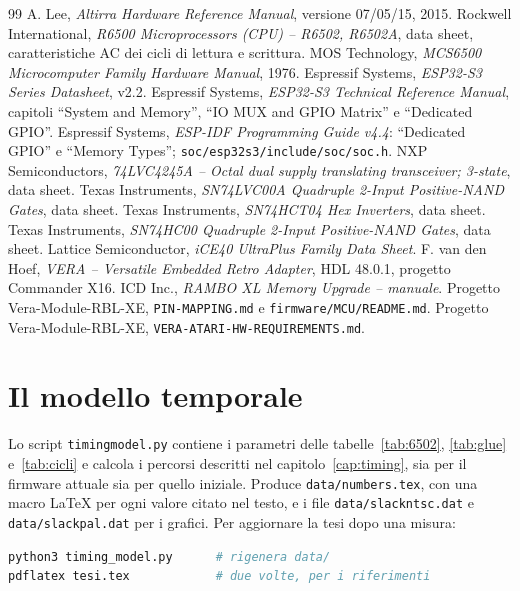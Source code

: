 \documentclass[11pt,a4paper,twoside,openright]{report}
\DeclareRobustCommand{\code}[1]{\begingroup\renewcommand{\_}{\textunderscore\allowbreak}\texttt{#1}\endgroup}
\begin{document}
\begin{thebibliography}{99}
 A. Lee, \emph{Altirra Hardware Reference Manual}, versione 07/05/15, 2015.
 Rockwell International, \emph{R6500 Microprocessors (CPU) -- R6502, R6502A},
  data sheet, caratteristiche AC dei cicli di lettura e scrittura.
 MOS Technology, \emph{MCS6500 Microcomputer Family Hardware Manual}, 1976.
 Espressif Systems, \emph{ESP32-S3 Series Datasheet}, v2.2.
 Espressif Systems, \emph{ESP32-S3 Technical Reference Manual},
  capitoli \enquote{System and Memory}, \enquote{IO MUX and GPIO Matrix} e
  \enquote{Dedicated GPIO}.
 Espressif Systems, \emph{ESP-IDF Programming Guide v4.4}:
  \enquote{Dedicated GPIO} e \enquote{Memory Types}; \code{soc/esp32s3/include/soc/soc.h}.
 NXP Semiconductors, \emph{74LVC4245A -- Octal dual supply translating
  transceiver; 3-state}, data sheet.
 Texas Instruments, \emph{SN74LVC00A Quadruple 2-Input Positive-NAND Gates}, data sheet.
 Texas Instruments, \emph{SN74HCT04 Hex Inverters}, data sheet.
 Texas Instruments, \emph{SN74HC00 Quadruple 2-Input Positive-NAND Gates},
  data sheet.
 Lattice Semiconductor, \emph{iCE40 UltraPlus Family Data Sheet}.
 F. van den Hoef, \emph{VERA -- Versatile Embedded Retro Adapter}, HDL
  48.0.1, progetto Commander X16.
 ICD Inc., \emph{RAMBO XL Memory Upgrade -- manuale}.
 Progetto Vera-Module-RBL-XE, \code{PIN-MAPPING.md} e
  \code{firmware/MCU/README.md}.
 Progetto Vera-Module-RBL-XE, \code{VERA-ATARI-HW-REQUIREMENTS.md}.
\end{thebibliography}

\appendix
\chapter{Il modello temporale}
\label{app:modello}

Lo script \code{timing\_model.py} contiene i parametri delle
tabelle~\ref{tab:6502}, \ref{tab:glue} e~\ref{tab:cicli} e calcola i percorsi descritti nel
capitolo~\ref{cap:timing}, sia per il firmware attuale sia per quello iniziale. Produce
\code{data/numbers.tex}, con una macro \LaTeX{} per ogni valore citato nel testo, e i file
\code{data/slack\_ntsc.dat} e \code{data/slack\_pal.dat} per i grafici. Per aggiornare la
tesi dopo una misura:
\begin{lstlisting}[language=bash]
python3 timing_model.py      # rigenera data/
pdflatex tesi.tex            # due volte, per i riferimenti
\end{lstlisting}
\end{document}
